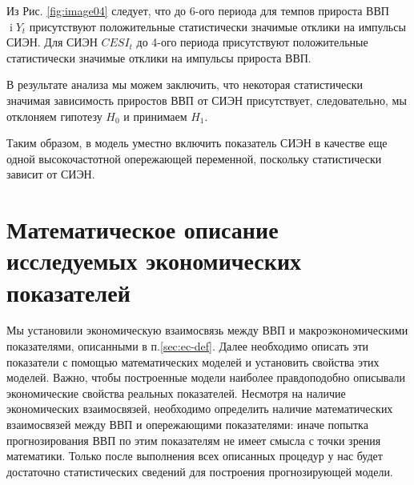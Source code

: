 \documentclass[a4paper, 14pt]{extreport}
\numberwithin{equation}{section}
\renewcommand{\i}{\operatorname{i}}
\numberwithin{equation}{section}
\begin{document}
	 Из Рис. \ref{fig:image04} следует, что до 6-ого периода для темпов прироста ВВП $\i Y_{t}$ присутствуют положительные статистически значимые отклики на импульсы СИЭН. Для СИЭН ${CESI}_{t}$ до 4-ого периода присутствуют положительные статистически значимые отклики на импульсы прироста ВВП.
	 
	 В результате анализа мы можем заключить, что некоторая статистически значимая зависимость приростов ВВП от СИЭН присутствует, следовательно, мы отклоняем гипотезу $H_0$ и принимаем $H_1$. 
	 
	 Таким образом, в модель уместно включить показатель СИЭН в качестве еще одной высокочастотной опережающей переменной, поскольку статистически зависит от СИЭН.
	 
	\section{Математическое описание исследуемых экономических показателей}
	Мы установили экономическую взаимосвязь между ВВП и макроэкономическими показателями, описанными в п.\ref{sec:ec-def}. Далее необходимо описать эти показатели с помощью математических моделей и установить свойства этих моделей. Важно, чтобы построенные модели наиболее правдоподобно описывали экономические свойства реальных показателей. Несмотря на наличие экономических взаимосвязей, необходимо определить наличие математических взаимосвязей между ВВП и опережающими показателями: иначе попытка прогнозирования ВВП по этим показателям не имеет смысла с точки зрения математики. Только после выполнения всех описанных процедур у нас будет достаточно статистических сведений для построения прогнозирующей модели.
	
\end{document}
